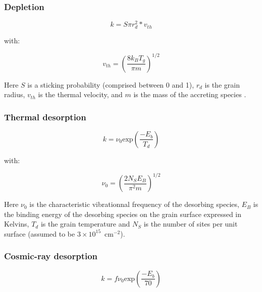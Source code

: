 \documentclass[a4paper,12pt]{article}
\begin{document}
{\subsubsection{Depletion}
\label{sec:depletion}

\begin{equation}
  k = S \pi r_{d}^2 * v_{th}
  \label{eq:depletion}
\end{equation}

\noindent
with:

\begin{equation}
  v_{th} = \left( \frac{8 k_{B} T_{g}}{\pi m} \right)^{1/2}
  \label{eq:thermal-veloc}
\end{equation}

\noindent
Here $S$ is a sticking probability (comprised between 0 and 1),
$r_{d}$ is the grain radius, $v_{th}$ is the thermal velocity, and $m$
is the mass of the accreting species \citep{Bergin95}.

\subsubsection{Thermal desorption}
\label{sec:thermal-desorption}

\begin{equation}
  k = \nu_{0} \mathrm{exp} \left( \frac{-E_{b}}{T_{d}} \right)
  \label{eq:thermal-desorption}
\end{equation}

\noindent
with:

\begin{equation}
  \nu_{0} = \left( \frac{2 N_{S} E_{B}}{\pi^2 m} \right)^{1/2}
  \label{eq:vibration-freq}
\end{equation}

\noindent
Here $\nu_{0}$ is the characteristic vibrationnal frequency of the
desorbing species, $E_{B}$ is the binding energy of the desorbing
species on the grain surface expressed in Kelvins, $T_{d}$ is the
grain temperature and $N_{S}$ is the number of sites per unit surface
(assumed to be $3 \times 10^{15}$~cm$^{-2}$).

\subsubsection{Cosmic-ray desorption}
\label{sec:cosm-ray-desorpt}

\begin{equation}
  k = f \nu_{0} \mathrm{exp} \left( \frac{-E_{b}}{70} \right)
  \label{eq:cosmic-ray-desorption}
\end{equation}

}
\end{document}
